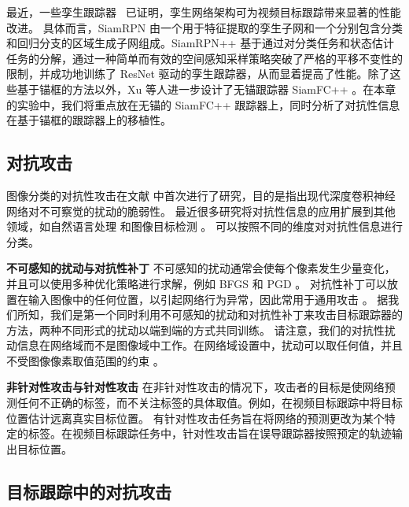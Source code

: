最近，一些孪生跟踪器~\cite{SiamRPN,SiamRPN++,SiamFC++} 已证明，孪生网络架构可为视频目标跟踪带来显著的性能改进。
具体而言，SiamRPN \cite{SiamRPN} 由一个用于特征提取的孪生子网和一个分别包含分类和回归分支的区域生成子网组成。SiamRPN++ \cite{SiamRPN++} 基于通过对分类任务和状态估计任务的分解，通过一种简单而有效的空间感知采样策略突破了严格的平移不变性的限制，并成功地训练了 ResNet 驱动的孪生跟踪器，从而显着提高了性能。除了这些基于锚框的方法以外，Xu 等人进一步设计了无锚跟踪器 SiamFC++ \cite{SiamFC++}。在本章的实验中，我们将重点放在无锚的 SiamFC++ 跟踪器上，同时分析了对抗性信息在基于锚框的跟踪器上的移植性。

\subsection{对抗攻击}

图像分类的对抗性攻击在文献 \cite{intriguing} 中首次进行了研究，目的是指出现代深度卷积神经网络对不可察觉的扰动的脆弱性。
最近很多研究将对抗性信息的应用扩展到其他领域，如自然语言处理 \cite{generating} 和图像目标检测 \cite{wei2019transferable}。
可以按照不同的维度对对抗性信息进行分类。

\textbf{不可感知的扰动与对抗性补丁} 不可感知的扰动通常会使每个像素发生少量变化，并且可以使用多种优化策略进行求解，例如 BFGS \cite{intriguing} 和 PGD \cite{PGD}。
对抗性补丁可以放置在输入图像中的任何位置，以引起网络行为异常，因此常用于通用攻击 \cite{patch}。
据我们所知，我们是第一个同时利用不可感知的扰动和对抗性补丁来攻击目标跟踪器的方法，两种不同形式的扰动以端到端的方式共同训练。
请注意，我们的对抗性扰动信息在网络域而不是图像域中工作。在网络域设置中，扰动可以取任何值，并且不受图像像素取值范围的约束 \cite{karmon2018lavan}。

\textbf{非针对性攻击与针对性攻击} 在非针对性攻击的情况下，攻击者的目标是使网络预测任何不正确的标签，而不关注标签的具体取值。例如，在视频目标跟踪中将目标位置估计远离真实目标位置。
有针对性攻击任务旨在将网络的预测更改为某个特定的标签。在视频目标跟踪任务中，针对性攻击旨在误导跟踪器按照预定的轨迹输出目标位置。

\subsection{目标跟踪中的对抗攻击}

